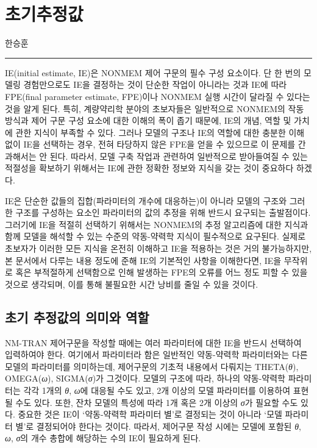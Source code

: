 \documentclass[
  10pt,
  krantz2,
  a4paper]{krantz}
\theoremstyle{definition}
\theoremstyle{definition}
\theoremstyle{definition}
\theoremstyle{remark}
\begin{document}
\hypertarget{IE}{%
\chapter{초기추정값}\label{IE}}

한승훈

\begin{center}\rule{0.5\linewidth}{0.5pt}\end{center}

IE(initial estimate, IE)은 NONMEM 제어 구문의 필수 구성 요소이다. 단 한 번의 모델링 경험만으로도 IE을 결정하는 것이 단순한 작업이 아니라는 것과 IE에 따라 FPE(final parameter estimate, FPE)이나 NONMEM 실행 시간이 달라질 수 있다는 것을 알게 된다. 특히, 계량약리학 분야의 초보자들은 일반적으로 NONMEM의 작동 방식과 제어 구문 구성 요소에 대한 이해의 폭이 좁기 때문에, IE의 개념, 역할 및 가치에 관한 지식이 부족할 수 있다. 그러나 모델의 구조나 IE의 역할에 대한 충분한 이해 없이 IE을 선택하는 경우, 전혀 타당하지 않은 FPE을 얻을 수 있으므로 이 문제를 간과해서는 안 된다. 따라서, 모델 구축 작업과 관련하여 일반적으로 받아들여질 수 있는 적절성을 확보하기 위해서는 IE에 관한 정확한 정보와 지식을 갖는 것이 중요하다 하겠다.

IE은 단순한 값들의 집합(파라미터의 개수에 대응하는)이 아니라 모델의 구조와 그러한 구조를 구성하는 요소인 파라미터의 값의 추정을 위해 반드시 요구되는 출발점이다. 그러기에 IE을 적절히 선택하기 위해서는 NONMEM의 추정 알고리즘에 대한 지식과 함께 모델을 해석할 수 있는 수준의 약동-약력학 지식이 필수적으로 요구된다. 실제로 초보자가 이러한 모든 지식을 온전히 이해하고 IE을 적용하는 것은 거의 불가능하지만, 본 문서에서 다루는 내용 정도에 준해 IE의 기본적인 사항을 이해한다면, IE을 무작위로 혹은 부적절하게 선택함으로 인해 발생하는 FPE의 오류를 어느 정도 피할 수 있을 것으로 생각되며, 이를 통해 불필요한 시간 낭비를 줄일 수 있을 것이다.

\hypertarget{IE-role}{%
\section{초기 추정값의 의미와 역할}\label{IE-role}}

NM-TRAN 제어구문을 작성할 때에는 여러 파라미터에 대한 IE을 반드시 선택하여 입력하여야 한다. 여기에서 파라미터라 함은 일반적인 약동-약력학 파라미터와는 다른 모델의 파라미터를 의미하는데, 제어구문의 기초적 내용에서 다뤄지는 THETA(\emph{θ}), OMEGA(\emph{ω}), SIGMA(\emph{σ})가 그것이다. 모델의 구조에 따라, 하나의 약동-약력학 파라미터는 각각 1개의 \emph{θ}, \emph{ω}에 대응될 수도 있고, 2개 이상의 모델 파라미터를 이용하여 표현될 수도 있다. 또한, 잔차 모델의 특성에 따라 1개 혹은 2개 이상의 \emph{σ}가 필요할 수도 있다. 중요한 것은 IE이 `약동-약력학 파라미터 별'로 결정되는 것이 아니라 `모델 파라미터 별'로 결정되어야 한다는 것이다. 따라서, 제어구문 작성 시에는 모델에 포함된 \emph{θ}, \emph{ω}, \emph{σ}의 개수 총합에 해당하는 수의 IE이 필요하게 된다.
\end{document}
